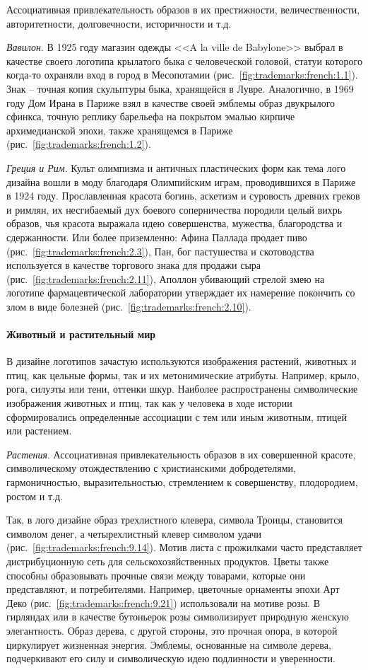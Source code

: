 Ассоциативная привлекательность образов в их престижности, величественности,
авторитетности, долговечности, историчности и т.д.

\emph{Вавилон}. В 1925 году магазин одежды <<A la ville de Babylone>> выбрал в качестве своего логотипа крылатого быка с человеческой головой, статуи которого когда-то охраняли вход в город в
  Месопотамии (рис.~\ref{fig:trademarks:french:1.1}).  Знак -- точная копия скульптуры быка, хранящейся в
  Лувре. Аналогично, в 1969 году Дом Ирана в Париже взял в качестве своей эмблемы образ двукрылого
  сфинкса, точную реплику барельефа на покрытом эмалью кирпиче архимедианской эпохи, также хранящемся
  в Париже (рис.~\ref{fig:trademarks:french:1.2}).
  
\emph{Греция и Рим}. Культ олимпизма и античных пластических форм как тема лого дизайна вошли в моду
  благодаря Олимпийским играм, проводившихся в Париже в 1924 году. Прославленная красота богинь,
  аскетизм и суровость древних греков и римлян, их несгибаемый дух боевого соперничества породили
  целый вихрь образов, чья красота выражала идею совершенства, мужества, благородства и
  сдержанности. Или более приземленно: Афина Паллада продает пиво (рис.~\ref{fig:trademarks:french:2.3}),
  Пан, бог пастушества и скотоводства используется в качестве торгового знака для продажи сыра
  (рис.~\ref{fig:trademarks:french:2.11}), Аполлон убивающий стрелой
  змею на логотипе фармацевтической лаборатории утверждает их намерение покончить со злом в виде
  болезней (рис.~\ref{fig:trademarks:french:2.10}).

\paragraph{Животный и растительный мир}

В дизайне логотипов зачастую используются изображения растений, животных и птиц,
как цельные формы, так и их метонимические атрибуты. Например, крыло, рога,
силуэты или тени, оттенки шкур. Наиболее распространены символические изображения
животных и птиц, так как у человека в ходе истории сформировались определенные
ассоциации с тем или иным животным, птицей или растением.

\emph{Растения}. Ассоциативная привлекательность образов в их совершенной
  красоте, символическому отождествлению с христианскими добродетелями,
  гармоничностью, выразительностью, стремлением к совершенству, плодородием,
  ростом и т.д.

  Так, в лого дизайне образ трехлистного клевера, символа Троицы, становится
  символом денег, а четырехлистный клевер символом удачи
  (рис.~\ref{fig:trademarks:french:9.14}). Мотив листа с прожилками часто
  представляет дистрибуционную сеть для сельскохозяйственных продуктов. Цветы
  также способны образовывать прочные связи между товарами, которые они
  представляют, и потребителями. Например, цветочные орнаменты эпохи Арт Деко
  (рис.~\ref{fig:trademarks:french:9.21}) использовали на мотиве розы.  В
  гирляндах или в качестве бутоньерок розы символизирует природную женскую
  элегантность. Образ дерева, с другой стороны, это прочная опора, в которой
  циркулирует жизненная энергия. Эмблемы, основанные на символе дерева,
  подчеркивают его силу и символическую идею подлинности и уверенности.

